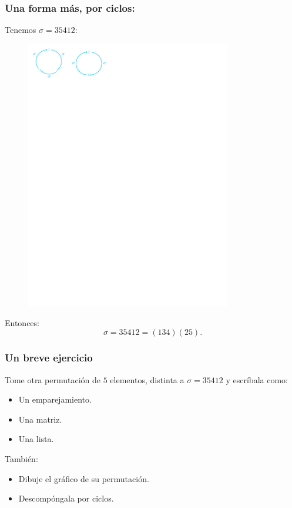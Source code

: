 \documentclass[grey]{beamer}
\newcommand{\sg}{\sigma}
\begin{document}
\begin{frame}[t]\frametitle{Una forma más, por ciclos:}
Tenemos $\sg=35412$:\pause
\begin{center}
  \begin{figure}
    \centering
   \includegraphics[width=0.8\textwidth, trim= 0.5cm 24cm 13cm 0.25cm,clip]{fig1.pdf}%
   \end{figure}
   \end{center}\pause
Entonces: 
$$\sg=35412=(134)(25).$$
\end{frame}

\begin{frame}[t]\frametitle{Un breve ejercicio}
Tome otra permutación de $5$ elementos, distinta a $\sg=35412$ y escríbala como:
\begin{itemize}
  \item Un emparejamiento.
  \item Una matriz.
  \item Una lista.
\end{itemize}
También:
\begin{itemize}
  \item Dibuje el gráfico de su permutación.
  \item Descompóngala por ciclos.
\end{itemize}
  
\end{frame}
\end{document}
